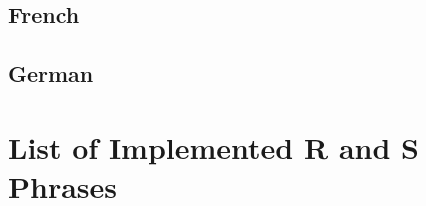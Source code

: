 \documentclass[a4paper,notitlepage,parskip=half]{scrreprt}
\begin{document}
\subsection{French}
\medskip
{}
\allhpstatements

\subsection{German}
\medskip
{}
\allhpstatements
{}


\section{List of Implemented R and S Phrases}

\newenvironment{RandS}{\bigskip\bgroup\footnotesize\noindent}{\par\egroup}
\newcommand{\rs}[2][]{\textbf{\rsnumber[#1]{#2}}: \rsphrase{}}
\newcommand{\rsskip}{\par\medskip}
\end{document}
